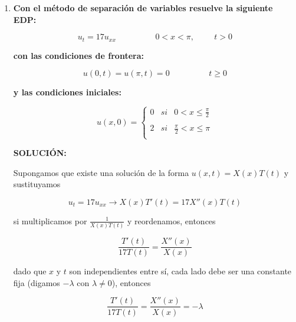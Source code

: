 \documentclass[12pt,a4paper]{article}
\begin{document}
\begin{enumerate}
    
    
    
    
    
    \item\textbf{Con el método de separación de variables resuelve la siguiente EDP:}
    
    \begin{equation*}
        u_t = 17 u_{xx} \hspace{2cm} 0<x<\pi, \hspace{1cm} t>0
    \end{equation*}
    
    \textbf{con las condiciones de frontera:}
    
    \begin{equation*}
        u(0,t) = u(\pi,t)= 0 \hspace{2cm} t \geq 0
    \end{equation*}
    
    \textbf{y las condiciones iniciales:}
    
    \begin{equation*}
        u(x,0) = \left\{ \begin{array}{lcc}
             0 &   si  & 0 < x \leq \frac{\pi}{2}\\
             \\ 2 &  si & \frac{\pi}{2}< x \leq \pi \\
             \end{array}
        \right.
    \end{equation*}
    
    \textbf{SOLUCIÓN:}
    
    Supongamos que existe una solución de la forma $u(x,t) = X(x)T(t)$ y sustituyamos
    
    \begin{equation*}
        u_t = 17 u_{xx} \rightarrow X(x)T'(t) = 17X''(x)T(t)
    \end{equation*}
    
    si multiplicamos por $\frac{1}{X(x)T(t)}$ y reordenamos, entonces
    
    \begin{equation*}
        \frac{T'(t)}{17T(t)} = \frac{X''(x)}{X(x)}
    \end{equation*}
    
    dado que $x$ y $t$ son independientes entre sí, cada lado debe ser una constante fija (digamos $-\lambda$ con $\lambda \neq 0$), entonces
    
    \begin{equation*}
        \frac{T'(t)}{17T(t)} =\frac{X''(x)}{X(x)} = - \lambda
    \end{equation*}
    

\end{enumerate}
\end{document}

